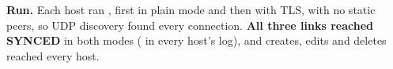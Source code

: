 \textbf{Run.} Each host ran , first in plain mode and then with TLS, with no
static peers, so UDP discovery found every connection. \textbf{All three links reached SYNCED} in both modes
( in every host's log), and creates, edits and deletes reached
every host.
